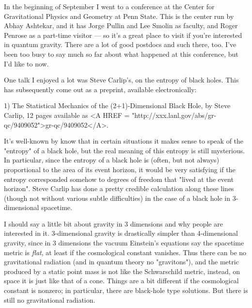 

In the beginning of September I went to a conference at the Center for
Gravitational Physics and Geometry at Penn State.  This is the center
run by Abhay Ashtekar, and it has Jorge Pullin and Lee Smolin as
faculty, and Roger Penrose as a part-time visitor --- so it's a
great place to visit if you're interested in quantum gravity.  There
are a lot of good postdocs and such there, too.  I've been too busy
to say much so far about what happened at this conference, but I'd like
to now.  

One talk I enjoyed a lot was Steve Carlip's, on the entropy of black
holes.  This has subsequently come out as a preprint, available
electronically:

1)  The Statistical Mechanics of the (2+1)-Dimensional Black Hole, by
Steve Carlip, 12 pages available as <A HREF = "http://xxx.lanl.gov/abs/gr-qc/9409052">gr-qc/9409052</A>.  

It's well-known by know that in certain situations it makes sense to
speak of the "entropy" of a black hole, but the real meaning of this
entropy is still mysterious.  In particular, since the entropy of a
black hole is (often, but not always) proportional to the area of its
event horizon, it would be very satisfying if the entropy corresponded
somehow to degrees of freedom that "lived at the event horizon".  Steve
Carlip has done a pretty credible calculation along these lines (though
not without various subtle difficulties) in the case of a black hole in
3-dimensional spacetime.

I should say a little bit about gravity in 3 dimensions and why people
are interested in it.  3-dimensional gravity is drastically simpler
than 4-dimensional gravity, since in 3 dimensions the vacuum
Einstein's equations say the spacetime metric is \emph{flat}, at least if the
cosmological constant vanishes.  Thus there can be no gravitational radiation
(and in quantum theory no "gravitons"), and the metric produced by a
static point mass is not like the Schwarschild metric, instead, on 
space it is just like that of a cone.  Things are a bit different if the
cosmological constant is nonzero; in particular, there are black-hole
type solutions.  But there is still no gravitational radiation.

